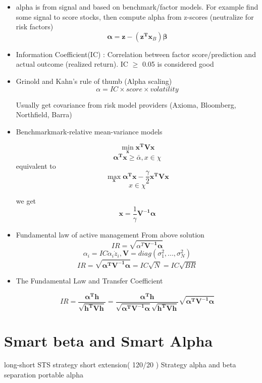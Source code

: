 \documentclass[11pt, openany]{book}              %
\begin{document}
\begin{itemize}
\item alpha is from signal and based on benchmark/factor models. For example find some signal to score stocks, then compute alpha from z-scores (neutralize for risk factors)
$$\mathbf{\alpha} = \mathbf{z} - (\mathbf{z^T}\mathbf{x}_B) \mathbf{\beta}$$

\item Information Coefficient(IC) : Correlation between factor score/prediction and actual outcome (realized return). IC $\geq$ 0.05 is considered good
\item Grinold and Kahn’s rule of thumb (Alpha scaling)
$$ \alpha = IC \times score \times volatility$$

Usually get covariance from risk model providers (Axioma, Bloomberg, Northfield, Barra)

\item Benchmarkmark-relative mean-variance models 

$$ \min_{\mathbf{x}} \mathbf{x^TVx} $$
$$ \boldsymbol{ \alpha^T x} \geq \bar{\alpha}, x \in \chi$$
equivalent to 
$$ \max_{\mathbf{x}} \boldsymbol{ \alpha^T x}  - \frac{\gamma}{2} \mathbf{x^TVx} $$
$$ x \in \chi$$

we get $$ \mathbf{x} = \frac{1}{\gamma} \boldsymbol{V^{-1}\alpha}$$

\item Fundamental law of active management
\subitem From above solution $$IR = \sqrt{\alpha^T\boldsymbol{V^{-1}\alpha}}$$
$$\alpha_i = IC \dot \alpha_i \dot z_i, \mathbf{V} = diag(\sigma_1^2, ..., \sigma_N^2)$$
$$IR = \sqrt{\boldsymbol{\alpha^T V^{-1}\alpha}} = IC \sqrt{N} = IC \sqrt{BR}$$
 
 \item The Fundamental Law and Transfer Coefficient
 
$$IR = \frac{\boldsymbol{\alpha^T h}}{\sqrt{\boldsymbol{h^TVh}}} = \frac{\boldsymbol{\alpha^T h}}{\sqrt{\boldsymbol{\alpha^T V^{-1}\alpha}}\sqrt{\boldsymbol{h^TVh}}} \sqrt{\boldsymbol{\alpha^T V^{-1}\alpha}}$$


\end{itemize}
\section{Smart beta and Smart Alpha}                  %

long-short STS strategy
short extension( 120/20 ) Strategy
alpha and beta separation
portable alpha 
\end{document}
